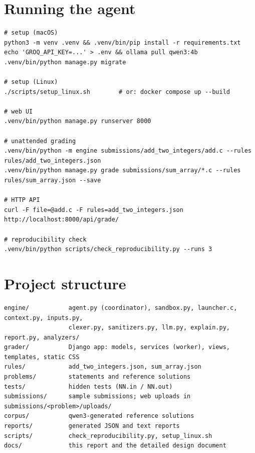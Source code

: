 \documentclass[11pt,a4paper]{article}
\begin{document}
\appendix
\section{Running the agent}
\begin{lstlisting}
# setup (macOS)
python3 -m venv .venv && .venv/bin/pip install -r requirements.txt
echo 'GROQ_API_KEY=...' > .env && ollama pull qwen3:4b
.venv/bin/python manage.py migrate

# setup (Linux)
./scripts/setup_linux.sh        # or: docker compose up --build

# web UI
.venv/bin/python manage.py runserver 8000

# unattended grading
.venv/bin/python -m engine submissions/add_two_integers/add.c --rules rules/add_two_integers.json
.venv/bin/python manage.py grade submissions/sum_array/*.c --rules rules/sum_array.json --save

# HTTP API
curl -F file=@add.c -F rules=add_two_integers.json http://localhost:8000/api/grade/

# reproducibility check
.venv/bin/python scripts/check_reproducibility.py --runs 3
\end{lstlisting}

\section{Project structure}
\begin{lstlisting}[basicstyle=\ttfamily\footnotesize]
engine/           agent.py (coordinator), sandbox.py, launcher.c, context.py, inputs.py,
                  clexer.py, sanitizers.py, llm.py, explain.py, report.py, analyzers/
grader/           Django app: models, services (worker), views, templates, static CSS
rules/            add_two_integers.json, sum_array.json
problems/         statements and reference solutions
tests/            hidden tests (NN.in / NN.out)
submissions/      sample submissions; web uploads in submissions/<problem>/uploads/
corpus/           qwen3-generated reference solutions
reports/          generated JSON and text reports
scripts/          check_reproducibility.py, setup_linux.sh
docs/             this report and the detailed design document
\end{lstlisting}
\end{document}
